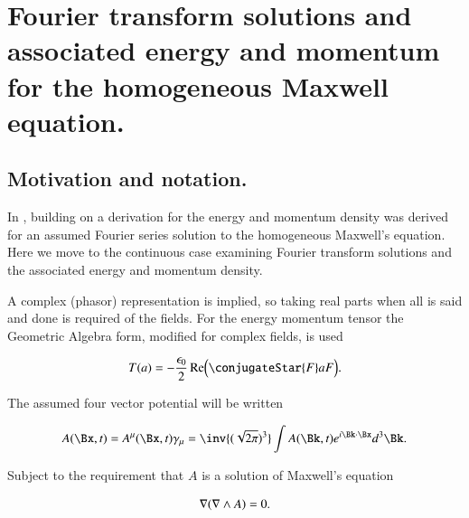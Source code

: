 %

%

\chapter{Fourier transform solutions and associated energy and momentum for the homogeneous Maxwell equation.}
\label{chap:ftMaxVacuum}
\date{Dec 21, 2009}

\beginArtNoToc

\section{Motivation and notation.}

In , building on \cite{complexFieldEnergy} a derivation for the energy and momentum density was derived for an assumed Fourier series solution to the homogeneous Maxwell's equation.  Here we move to the continuous case examining Fourier transform solutions and the associated energy and momentum density.

A complex (phasor) representation is implied, so taking real parts when all is said and done is required of the fields.  For the energy momentum tensor the Geometric Algebra form, modified for complex fields, is used

\begin{align}
\label{eqn:ftMaxVacuum:1}
T(a) = -\frac{\epsilon_0}{2} \Real \Bigl( \conjugateStar{F} a F \Bigr).
\end{align}

The assumed four vector potential will be written

\begin{align}
\label{eqn:ftMaxVacuum:2}
A(\Bx, t) = A^\mu(\Bx, t) \gamma_\mu = \inv{(\sqrt{2 \pi})^3} \int A(\Bk, t) e^{i \Bk \cdot \Bx } d^3 \Bk.
\end{align}

Subject to the requirement that $A$ is a solution of Maxwell's equation

\begin{align}
\label{eqn:ftMaxVacuum:3}
\nabla (\nabla \wedge A) = 0.
\end{align}

